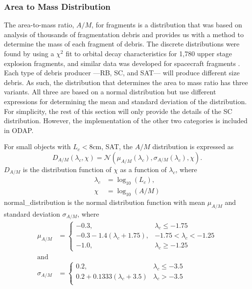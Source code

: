 \documentclass[a4paper, 12pt]{article}
\begin{document}
\subsubsection{Area to Mass Distribution }

The area-to-mass ratio, $A/M$, for fragments is a distribution that was based on analysis of thousands of fragmentation debris and provides us with a method to determine the mass of each fragment of debris. The discrete distributions were found by using a $\chi^2$ fit to orbital decay characteristics for 1,780 upper stage explosion fragments, and similar data was developed for spacecraft fragments \citep{johnson_nasas_2001}. Each type of debris producer ---RB, SC, and SAT--- will produce different size debris. As such, the distribution that determines the area to mass ratio has three variants. All three are based on a normal distribution but use different expressions for determining the mean and standard deviation of the distribution. For simplicity, the rest of this section will only provide the details of the SC distribution. However, the implementation of the other two categories is included in ODAP.

For small objects with $L_c < 8$cm, SAT, the $A/M$ distribution is expressed as
\begin{equation}
	D_{A/M}(\lambda_c, \chi) = \mathcal{N}(\mu_{A/M}(\lambda_c), \sigma_{A/M}(\lambda_c), \chi).
\end{equation}
$D_{A/M}$ is the distribution function of $\chi$ as a function of $\lambda_c$, where
\begin{align}
	\lambda_c &= \log_{10}(L_c),\\
	\chi &= \log_{10}(A/M)
\end{align}
\Gls{normal_distribution} is the normal distribution function with mean $\mu_{A/M}$ and standard deviation $\sigma_{A/M}$, where
\begin{align}
	 \mu_{A/M} &= \begin{cases} 
		-0.3, & \lambda_c\leq -1.75 \\
		-0.3 - 1.4(\lambda_c + 1.75), & -1.75 < \lambda_c <-1.25 \\
		-1.0, & \lambda_c \geq -1.25 
	\end{cases}\\
	\text{and}\\
	\sigma_{A/M} &= \begin{cases} 
		0.2, & \lambda_c \leq -3.5 \\
		0.2 + 0.1333(\lambda_c + 3.5) & \lambda_c > -3.5 \\
	\end{cases}
\end{align}
\end{document}
